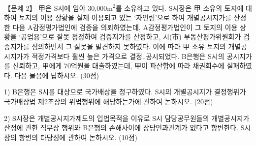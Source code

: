 \begin{longquestion}{【문제 2】}
甲은 S시에 임야 30,000m\textsuperscript{2}를 소유하고 있다. S시장은 甲 소유의 토지에 대하여 토지의 이용 상황을 실제 이용되고 있는 ‘자연림’으로 하여 개별공시지가를 산정한 다음 A감정평가법인에 검증을 의뢰하였는데, A감정평가법인이 그 토지의 이용 상황을 ‘공업용’으로 잘못 정정하여 검증지가를 산정하고, 시(市) 부동산평가위원회가 검증지가를 심의하면서 그 잘못을 발견하지 못하였다. 이에 따라 甲 소유 토지의 개별공시지가가 적정가격보다 훨씬 높은 가격으로 결정․공시되었다. B은행은 S시의 공시지가를 신뢰하고, 甲에게 70억원을 대출하였는데, 甲이 파산함에 따라 채권회수에 실패하였다. 다음 물음에 답하시오. (30점) \par
1) B은행은 S시를 대상으로 국가배상을 청구하였다. S시의 개별공시지가 결정행위가 국가배상법 제2조상의 위법행위에 해당하는가에 관하여 논하시오. (20점) \par
2) S시장은 개별공시지가제도의 입법목적을 이유로 S시 담당공무원들의 개별공시지가 산정에 관한 직무상 행위와 B은행의 손해사이에 상당인과관계가 없다고 항변한다. S시장의 항변의 타당성에 관하여 논하시오. (10점) \par
\end{longquestion}
